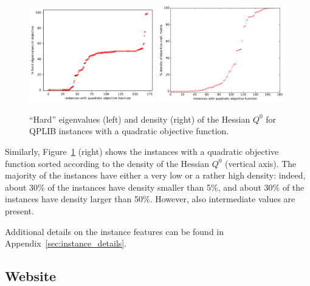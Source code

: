 \begin{figure}\centering
  \includegraphics[width=0.49\textwidth]{pic_neg_eig.pdf}
  \includegraphics[width=0.49\textwidth]{pic_density.pdf}
  \caption{``Hard'' eigenvalues (left) and density (right) of the Hessian $Q^0$ for QPLIB instances with a quadratic objective function. \label{fig:pic_neg_eig}}
\end{figure}

Similarly, Figure~\ref{fig:pic_neg_eig} (right) shows the instances with a
quadratic objective function sorted according to the density of the
Hessian $Q^0$ (vertical axis). The majority of the instances have either
a very low or a rather high density: indeed, about 30\% of the instances
have density smaller than 5\%, and about 30\% of the instances have
density larger than 50\%. However, also intermediate values are present.


Additional details on the instance features can be found in Appendix~\ref{sec:instance_details}.


\subsection{Website}\label{subsec:website}


